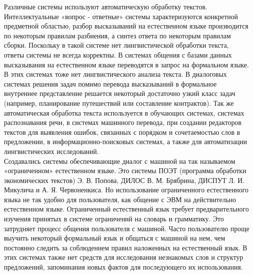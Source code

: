 Различные системы используют автоматическую обработку текстов. Интеллектуальные «вопрос - ответные» системы характеризуются конкретной предметной областью, разбор высказываний на естественном языке производится по некоторым правилам разбиения, а синтез ответа по некоторым правилам сборки. Поскольку в такой системе нет лингвистической обработки текста, ответы системы не всегда корректны. В системах общения с базами данных высказывания на естественном языке переводятся в запрос на формальном языке. В этих системах тоже нет лингвистического анализа текста. В диалоговых системах решения задач помимо перевода высказываний в формальное внутреннее представление решается некоторый достаточно узкий класс задач (например, планирование путешествий или составление контрактов). Так же автоматическая обработка текста используется в обучающих системах, системах распознавания речи, в системах машинного перевода, при создании редакторов текстов для выявления ошибок, связанных с порядком и сочетаемостью слов в предложении, в информационно-поисковых системах, а также для автоматизации лингвистических исследований. \\
Создавались системы обеспечивающие диалог с машиной на так называемом «ограниченном» естественном языке. Это системы ПОЭТ (программа обработки экономических текстов) Э. В. Попова, ДИЛОС В. М. Брябрина, ДИСПУТ Л. И. Микулича и А. Я. Червоненкиса. Но использование ограниченного естественного языка не так удобно для пользователя, как общение с ЭВМ на действительно естественном языке. Ограниченный естественный язык требует предварительного изучения принятых в системе ограничений на словарь и грамматику. Это затрудняет процесс общения пользователя с машиной. Часто пользователю проще выучить некоторый формальный язык и общаться с машиной на нем, чем постоянно следить за соблюдением правил наложенных на естественный язык. В этих системах также нет средств для исследования незнакомых слов и структур предложений, запоминания новых фактов для последующего их использования. \\
